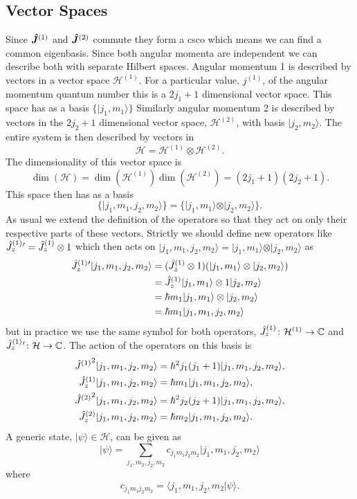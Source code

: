 \documentclass[a4paper]{article}
\renewcommand{\ket}[1]{\vert {#1} \rangle}
\renewcommand{\braket}[2]{\langle {#1} \vert {#2} \rangle}
\newcommand{\hilbert}{\mathcal{H}}
\renewcommand{\ident}{1}
\newcommand{\tensorProd}{\otimes}
\newcommand{\vecoperator}[1]{\vv{\operator{#1}}}
\newcommand{\angmomsquared}[1]{{\tensor{\operator{J}}{^{(#1)}}}^2}
\theoremstyle{definition}
\begin{document}
    \subsection{Vector Spaces}
    Since \(\vecoperator{J}^{(1)}\) and \(\vecoperator{J}^{(2)}\) commute they form a \gls{csco} which means we can find a common eigenbasis.
    Since both angular momenta are independent we can describe both with separate Hilbert spaces.
    Angular momentum 1 is described by vectors in a vector space \(\hilbert^{(1)}\).
    For a particular value, \(j^{(1)}\), of the angular momentum quantum number this is a \(2j_1 + 1\) dimensional vector space.
    This space has as a basis \(\{\ket{j_1, m_1}\}\)
    Similarly angular momentum 2 is described by vectors in the \(2j_2 + 1\) dimensional vector space, \(\hilbert^{(2)}\), with basis \(\ket{j_2, m_2}\).
    The entire system is then described by vectors in
    \[\hilbert = \hilbert^{(1)}\tensorProd\hilbert^{(2)}.\]
    The dimensionality of this vector space is
    \[\dim(\hilbert) = \dim(\hilbert^{(1)})\dim(\hilbert^{(2)}) = (2j_1 + 1)(2j_2 + 1).\]
    This space then has as a basis
    \[\{\ket{j_1, m_1, j_2, m_2}\} = \{\ket{j_1, m_1}\tensorProd\ket{j_2, m_2}\}.\]
    As usual we extend the definition of the operators so that they act on only their respective parts of these vectors.
    Strictly we should define new operators like \({\operator{J}^{(1)}_z}{'} = \operator{J}^{(1)}_z\tensorProd\ident\) which then acts on \(\ket{j_1, m_1, j_2, m_2} = \ket{j_1, m_1}\tensorProd\ket{j_2, m_2}\) as
    \begin{align*}
        {\operator{J}^{(1)}_z}{'}\ket{j_1, m_1, j_2, m_2} &= (\operator{J}^{(1)}_z\tensorProd\ident)(\ket{j_1, m_1}\tensorProd\ket{j_2, m_2})\\
        &= \operator{J}^{(1)}_z\ket{j_1, m_1}\tensorProd\ident\ket{j_2, m_2}\\
        &= \hbar m_1\ket{j_1, m_1}\tensorProd\ket{j_2, m_2}\\
        &= \hbar m_1\ket{j_1, m_1, j_2, m_2}
    \end{align*}
    but in practice we use the same symbol for both operators, \(\operator{J}^{(1)}_z\colon\hilbert^{(1)}\to\complex\) and \(\operator{J}^{(1)}_z{'}\colon\hilbert\to\complex\).
    The action of the operators on this basis is
    \begin{align*}
        \angmomsquared{1}\ket{j_1, m_1, j_2, m_2} &= \hbar^2j_1(j_1 + 1)\ket{j_1, m_1, j_2, m_2},\\
        \operator{J}^{(1)}_z\ket{j_1, m_1, j_2, m_2} &= \hbar m_1\ket{j_1, m_1, j_2, m_2},\\
        \angmomsquared{2}\ket{j_1, m_1, j_2, m_2} &= \hbar^2j_2(j_2 + 1)\ket{j_1, m_1, j_2, m_2},\\
        \operator{J}^{(2)}_z\ket{j_1, m_1, j_2, m_2} &= \hbar m_2\ket{j_1, m_1, j_2, m_2}.
    \end{align*}
    A generic state, \(\ket{\psi}\in\hilbert\), can be given as
    \[\ket{\psi} = \sum_{j_1, m_2, j_2, m_2} c_{j_1m_1j_2m_2}\ket{j_1, m_1, j_2, m_2}\]
    where
    \[c_{j_1m_1j_2m_2} = \braket{j_1, m_1, j_2, m_2}{\psi}.\]
    
\end{document}
